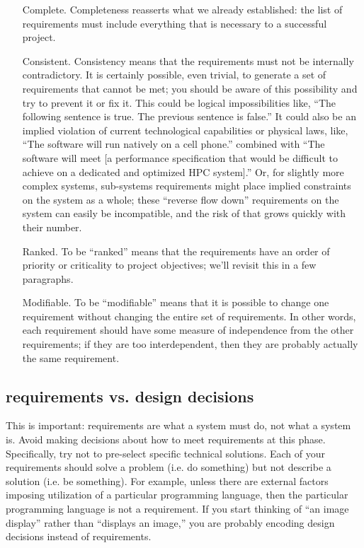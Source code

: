 \documentclass[12pt,oneside]{book}
\begin{document}
\begin{itemize}[wide, labelwidth=!, labelindent=0pt, font=\bfseries]
\item[Complete.] Completeness reasserts what we already established: the list of requirements must include everything that is necessary to a successful project.
	
\item[Consistent.] Consistency means that the requirements must not be internally contradictory. It is certainly possible, even trivial, to generate a set of requirements that cannot be met; you should be aware of this possibility and try to prevent it or fix it. This could be logical impossibilities like, ``The following sentence is true. The previous sentence is false.'' It could also be an implied violation of current technological capabilities or physical laws, like, ``The software will run natively on a cell phone.'' combined with ``The software will meet [a performance specification that would be difficult to achieve on a dedicated and optimized HPC system].'' Or, for slightly more complex systems, sub-systems requirements might place implied constraints on the system as a whole; these ``reverse flow down'' requirements on the system can easily be incompatible, and the risk of that grows quickly with their number.
	
\item[Ranked.] To be ``ranked'' means that the requirements have an order of priority or criticality to project objectives; we'll revisit this in a few paragraphs.
	
\item[Modifiable.] To be ``modifiable'' means that it is possible to change one requirement without changing the entire set of requirements. In other words, each requirement should have some measure of independence from the other requirements; if they are too interdependent, then they are probably actually the same requirement.
\end{itemize}

\subsection*{requirements vs. design decisions}

This is important: requirements are what a system must do, not what a system is. Avoid making decisions about how to meet requirements at this phase. Specifically, try not to pre-select specific technical solutions. Each of your requirements should solve a problem (i.e. do something) but not describe a solution (i.e. be something). For example, unless there are external factors imposing utilization of a particular programming language, then the particular programming language is not a requirement. If you start thinking of ``an image display'' rather than ``displays an image,'' you are probably encoding design decisions instead of requirements.
\end{document}

